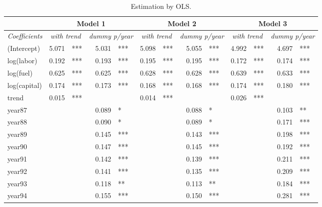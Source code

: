 \documentclass[a4paper]{article}
\begin{document}
\begin{table}[H]
  \centering
  \caption{Estimation by OLS.}
    \begin{tabular}{lrlrlrlrlrlrl} \hline
          & \multicolumn{4}{c}{\textbf{Model 1}}   & \multicolumn{4}{c}{\textbf{Model 2}}   & \multicolumn{4}{c}{\textbf{Model 3}} \\ \hline
    \textit{Coefficients} & \multicolumn{2}{c}{\textit{with trend}} & \multicolumn{2}{c}{\textit{dummy p/year}} & \multicolumn{2}{c}{\textit{with trend}} & \multicolumn{2}{c}{\textit{dummy p/year}} & \multicolumn{2}{c}{\textit{with trend}} & \multicolumn{2}{c}{\textit{dummy p/year}} \\ \hline \hline
    (Intercept) & 5.071 & ***   & 5.031 & ***   & 5.098 & ***   & 5.055 & ***   & 4.992 & ***   & 4.697 & *** \\
    log(labor) & 0.192 & ***   & 0.193 & ***   & 0.195 & ***   & 0.195 & ***   & 0.172 & ***   & 0.174 & *** \\
    log(fuel) & 0.625 & ***   & 0.625 & ***   & 0.628 & ***   & 0.628 & ***   & 0.639 & ***   & 0.633 & *** \\
    log(capital) & 0.174 & ***   & 0.173 & ***   & 0.168 & ***   & 0.168 & ***   & 0.174 & ***   & 0.180 & *** \\
    trend & 0.015 & ***   &       &       & 0.014 & ***   &       &       & 0.026 & ***   &       &  \\
    year87 &       &       & 0.089 & *     &       &       & 0.088 & *     &       &       & 0.103 & ** \\
    year88 &       &       & 0.090 & *     &       &       & 0.089 & *     &       &       & 0.171 & *** \\
    year89 &       &       & 0.145 & ***   &       &       & 0.143 & ***   &       &       & 0.198 & *** \\
    year90 &       &       & 0.147 & ***   &       &       & 0.145 & ***   &       &       & 0.192 & *** \\
    year91 &       &       & 0.142 & ***   &       &       & 0.139 & ***   &       &       & 0.211 & *** \\
    year92 &       &       & 0.141 & ***   &       &       & 0.135 & ***   &       &       & 0.209 & *** \\
    year93 &       &       & 0.118 & **    &       &       & 0.113 & **    &       &       & 0.184 & *** \\
    year94 &       &       & 0.155 & ***   &       &       & 0.150 & ***   &       &       & 0.281 & *** \\

\end{tabular}
\end{table}
\end{document}
